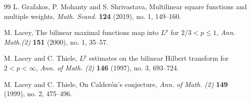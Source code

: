 \documentclass[a4paper,11pt,oneside]{amsart}
\theoremstyle{plain}
\theoremstyle{definition}
\begin{document}
\begin{thebibliography}{99}
 L. Grafakos, P. Mohanty and S. Shrivastava, Multilinear square functions and multiple weights, {\it Math. Scand.} \textbf{124} (2019), no. 1, 149--160.

 M. Lacey, The bilinear maximal functions map into $L^p$ for $2/3<p\leq 1$, {\it Ann. Math.(2)} \textbf{151} (2000), no. 1, 35--57.

 M. Lacey and C. Thiele, $L^p$ estimates on the bilinear Hilbert transform for $2<p<\infty$, {\it Ann. of Math. (2)} \textbf{146} (1997), no. 3, 693--724.

 M. Lacey and C. Thiele, On Calder\'on's conjecture, {\it Ann. of Math. (2)} \textbf{149} (1999), no. 2, 475--496.


\end{thebibliography}
\end{document}
